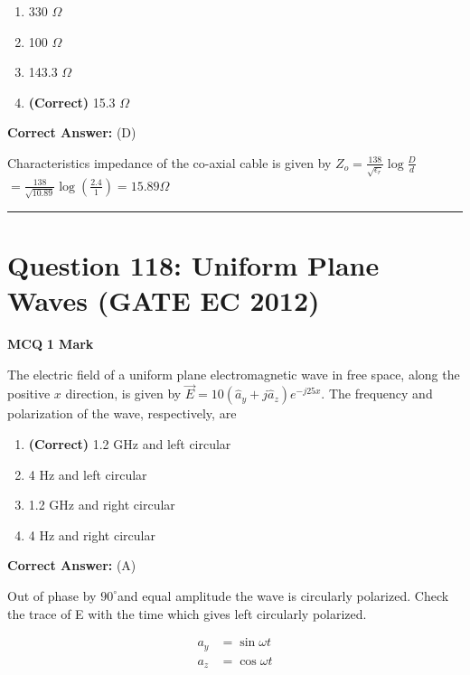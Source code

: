 \documentclass[11pt,a4paper]{article}
\begin{document}
\begin{enumerate}[label=(\Alph*)]
    \item 330 $\Omega$
    \item 100 $\Omega$
    \item 143.3 $\Omega$
    \item \textbf{(Correct)} 15.3 $\Omega$
\end{enumerate}

\noindent \textbf{Correct Answer:} (D)

\begin{tcolorbox}[solbox, title=Detailed Solution -- Question 117]
Characteristics impedance of the co-axial cable is given by 
$Z_{o}=\frac{138}{\sqrt{\epsilon_{r}}} \log \frac{D}{d}$
$=\frac{138}{\sqrt{10.89}} \log \left(\frac{2.4}{1}\right)=15.89 \Omega$
\end{tcolorbox}

\vspace{1.5em}
\hrule
\vspace{1.5em}

\section*{Question 118: Uniform Plane Waves (GATE EC 2012)}
\noindent \textbf{\color{primary}MCQ} \hfill \textbf{\color{secondary}1 Mark}


\noindent The electric field of a uniform plane electromagnetic wave in free space, along the positive
$x$ direction, is given by $\vec{E}=10(\hat{a}_{y}+j\hat{a}_{z})e^{-j25x}$. The frequency and polarization of the wave, respectively, are


\begin{enumerate}[label=(\Alph*)]
    \item \textbf{(Correct)} 1.2 GHz and left circular
    \item 4 Hz and left circular
    \item 1.2 GHz and right circular
    \item 4 Hz and right circular
\end{enumerate}

\noindent \textbf{Correct Answer:} (A)

\begin{tcolorbox}[solbox, title=Detailed Solution -- Question 118]
Out of phase by $90^{\circ}$and equal amplitude the wave is circularly polarized.
 Check the trace of E with the time which gives left  circularly polarized. 

\[
\begin{aligned} a_{y}&=\sin \omega t \\ a_{z}&=\cos \omega t \end{aligned}
\]
\end{tcolorbox}
\end{document}
